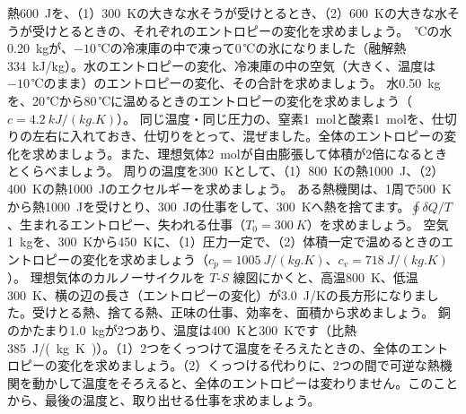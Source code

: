 \bkendproblems
{}
\bkproblem 熱\qty{600}{J}を、（1）\qty{300}{K}の大きな水そうが受けとるとき、（2）\qty{600}{K}の大きな水そうが受けとるときの、それぞれのエントロピーの変化を求めましょう。
\,℃の水\qty{0.20}{kg}が、$-10$\,℃の冷凍庫の中で凍って0\,℃の氷になりました（融解熱\qty{334}{kJ/kg}）。水のエントロピーの変化、冷凍庫の中の空気（大きく、温度は $-10$\,℃のまま）のエントロピーの変化、その合計を求めましょう。
\bkproblem 水\qty{0.50}{kg}を、20\,℃から80\,℃に温めるときのエントロピーの変化を求めましょう（$c=\qty{4.2}{kJ/(kg.K)}$）。
\bkproblem 同じ温度・同じ圧力の、窒素\qty{1}{mol}と酸素\qty{1}{mol}を、仕切りの左右に入れておき、仕切りをとって、混ぜました。全体のエントロピーの変化を求めましょう。また、理想気体\qty{2}{mol}が自由膨張して体積が2倍になるときとくらべましょう。
\bkproblem 周りの温度を\qty{300}{K}として、（1）\qty{800}{K}の熱\qty{1000}{J}、（2）\qty{400}{K}の熱\qty{1000}{J}のエクセルギーを求めましょう。
\bkproblem ある熱機関は、1周で\qty{500}{K}から熱\qty{1000}{J}を受けとり、\qty{300}{J}の仕事をして、\qty{300}{K}へ熱を捨てます。$\oint\delta Q/T$、生まれるエントロピー、失われる仕事（$T_0=\qty{300}{K}$）を求めましょう。
\bkproblem 空気\qty{1}{kg}を、\qty{300}{K}から\qty{450}{K}に、（1）圧力一定で、（2）体積一定で温めるときのエントロピーの変化を求めましょう（$c_p=\qty{1005}{J/(kg.K)}$、$c_v=\qty{718}{J/(kg.K)}$）。
\bkproblem 理想気体のカルノーサイクルを $T$-$S$ 線図にかくと、高温\qty{800}{K}、低温\qty{300}{K}、横の辺の長さ（エントロピーの変化）が\qty{3.0}{J/K}の長方形になりました。受けとる熱、捨てる熱、正味の仕事、効率を、面積から求めましょう。
\bkproblem 銅のかたまり\qty{1.0}{kg}が2つあり、温度は\qty{400}{K}と\qty{300}{K}です（比熱\qty{385}{J/(kg.K)}）。（1）2つをくっつけて温度をそろえたときの、全体のエントロピーの変化を求めましょう。（2）くっつける代わりに、2つの間で可逆な熱機関を動かして温度をそろえると、全体のエントロピーは変わりません。このことから、最後の温度と、取り出せる仕事を求めましょう。
